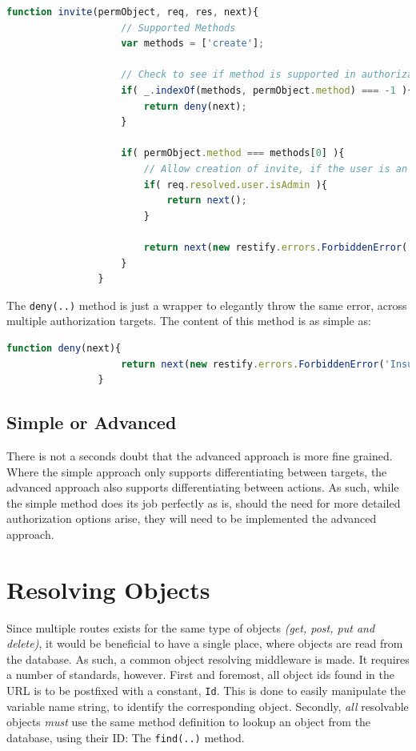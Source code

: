 			\begin{lstlisting}[gobble=16,language=JavaScript]
                function invite(permObject, req, res, next){
                    // Supported Methods
                    var methods = ['create'];
                    
                    // Check to see if method is supported in authorization suite
                    if( _.indexOf(methods, permObject.method) === -1 ){
                        return deny(next);
                    }
                    
                    if( permObject.method === methods[0] ){
                        // Allow creation of invite, if the user is an admin
                        if( req.resolved.user.isAdmin ){
                            return next();
                        }

                        return next(new restify.errors.ForbiddenError('Insufficient privileges'));
                    }
                }			
			\end{lstlisting}
			The \verb=deny(..)= method is just a wrapper to elegantly throw the same error, across multiple authorization targets. The content of this method is as simple as:
			\begin{lstlisting}[gobble=16,language=JavaScript]
                function deny(next){
                    return next(new restify.errors.ForbiddenError('Insufficient privileges'));
                }
			\end{lstlisting}

		\subsection{Simple or Advanced}
			There is not a seconds doubt that the advanced approach is more fine grained. Where the simple approach only supports differentiating between targets, the advanced approach also supports differentiating between actions. As such, while the simple method does its job perfectly as is, should the need for more detailed authorization options arise, they will need to be implemented the advanced approach.

	\section{Resolving Objects}
		\label{sec:impl:resolve}
		Since multiple routes exists for the same type of objects \emph{(get, post, put and delete)}, it would be beneficial to have a single place, where objects are read from the database. As such, a common object resolving middleware is made. It requires a number of standards, however. First and foremost, all object ids found in the URL is to be postfixed with a constant, \verb=Id=. This is done to easily manipulate the variable name string, to identify the corresponding object. Secondly, \emph{all} resolvable objects \emph{must} use the same method definition to lookup an object from the database, using their ID: The \verb=find(..)= method.

